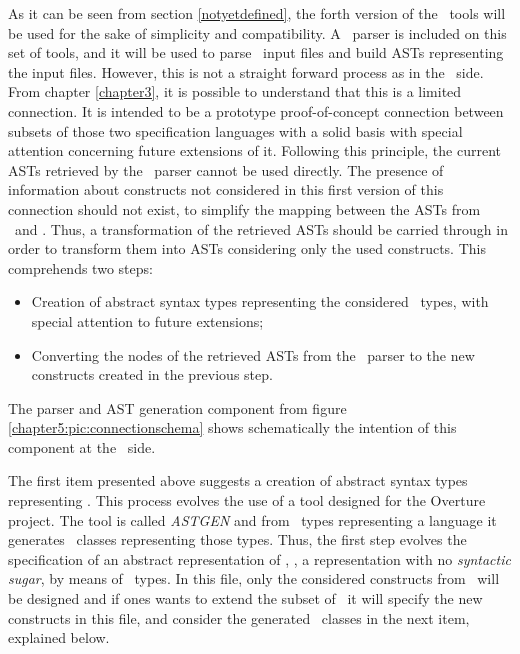 As it can be seen from section \ref{notyetdefined}, the forth version of the \jml\ tools will be used for the sake of simplicity and compatibility. A \jml\ parser is included on this set of tools, and it will be used to parse \jml\ input files and build ASTs representing the input files. However, this is not a straight forward process as in the \vpp\ side. From chapter \ref{chapter3}, it is possible to understand that this is a limited connection. It is intended to be a prototype proof-of-concept connection between subsets of those two specification languages with a solid basis with special attention concerning future extensions of it. Following this principle, the current ASTs retrieved by the \jml\ parser cannot be used directly. The presence of information about constructs not considered in this first version of this connection should not exist, to simplify the mapping between the ASTs from \jml\ and \vpp. Thus, a transformation of the retrieved ASTs should be carried through in order to transform them into ASTs considering only the used constructs. This comprehends two steps:
\begin{itemize}
\item Creation of abstract syntax types representing the considered \jml\ types, with special attention to future extensions;
\item Converting the nodes of the retrieved ASTs from the \jml\ parser to the new constructs created in the previous step.
\end{itemize}
The parser and AST generation component from figure \ref{chapter5:pic:connectionschema} shows schematically the intention of this component at the \jml\ side.

The first item presented above suggests a creation of abstract syntax types representing \jml. This process evolves the use of a tool designed for the Overture project. The tool is called \textit{ASTGEN} and from \vdm\ types representing a language it generates \java\ classes representing those types. Thus, the first step evolves the specification of an abstract representation of \jml, \ie, a representation with no \textit{syntactic sugar}, by means of \vdm\ types. In this file, only the considered constructs from \jml\ will be designed and if ones wants to extend the subset of \jml\ it will specify the new constructs in this file, and consider the generated \java\ classes in the next item, explained below.

